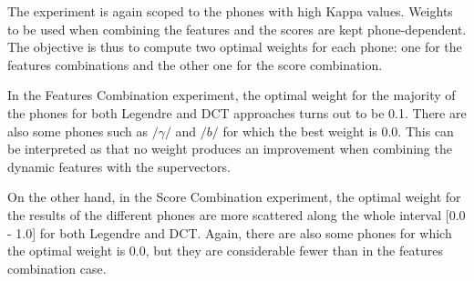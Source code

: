 The experiment is again scoped to the phones with high Kappa values.
Weights to be used when combining the features and the scores are kept phone-dependent.
The objective is thus to compute two optimal weights for each phone:
one for the features combinations and the other one for the score combination.



In the Features Combination experiment,
the optimal weight for the majority of the phones
for both Legendre and DCT approaches turns out to be 0.1.
There are also some phones such as
$/\gamma/$ and $/b/$ for which the best weight is 0.0.
This can be interpreted as that
no weight produces an improvement when combining the dynamic features with the supervectors.

On the other hand, in the Score Combination experiment, the optimal weight for
the results of the different phones are more scattered along the whole interval [0.0 - 1.0]
for both Legendre and
DCT. Again, there are also some phones for which the optimal weight is 0.0, but they are
considerable fewer than in the features combination case.

